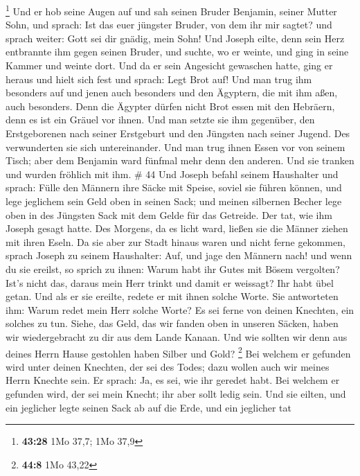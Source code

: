 \footnote{\textbf{43:28} 1Mo 37,7; 1Mo 37,9}  Und er hob
seine Augen auf und sah seinen Bruder Benjamin, seiner Mutter Sohn, und
sprach: Ist das euer jüngster Bruder, von dem ihr mir sagtet? und sprach
weiter: Gott sei dir gnädig, mein Sohn!  Und Joseph
eilte, denn sein Herz entbrannte ihm gegen seinen Bruder, und suchte, wo
er weinte, und ging in seine Kammer und weinte dort.  Und
da er sein Angesicht gewaschen hatte, ging er heraus und hielt sich fest
und sprach: Legt Brot auf!  Und man trug ihm besonders
auf und jenen auch besonders und den Ägyptern, die mit ihm aßen, auch
besonders. Denn die Ägypter dürfen nicht Brot essen mit den Hebräern,
denn es ist ein Gräuel vor ihnen.  Und man setzte sie ihm
gegenüber, den Erstgeborenen nach seiner Erstgeburt und den Jüngsten
nach seiner Jugend. Des verwunderten sie sich untereinander.
 Und man trug ihnen Essen vor von seinem Tisch; aber dem
Benjamin ward fünfmal mehr denn den anderen. Und sie tranken und wurden
fröhlich mit ihm. \# 44  Und Joseph befahl seinem
Haushalter und sprach: Fülle den Männern ihre Säcke mit Speise, soviel
sie führen können, und lege jeglichem sein Geld oben in seinen Sack;
 und meinen silbernen Becher lege oben in des Jüngsten
Sack mit dem Gelde für das Getreide. Der tat, wie ihm Joseph gesagt
hatte.  Des Morgens, da es licht ward, ließen sie die
Männer ziehen mit ihren Eseln.  Da sie aber zur Stadt
hinaus waren und nicht ferne gekommen, sprach Joseph zu seinem
Haushalter: Auf, und jage den Männern nach! und wenn du sie ereilst, so
sprich zu ihnen: Warum habt ihr Gutes mit Bösem vergolten?
 Ist's nicht das, daraus mein Herr trinkt und damit er
weissagt? Ihr habt übel getan.  Und als er sie ereilte,
redete er mit ihnen solche Worte.  Sie antworteten ihm:
Warum redet mein Herr solche Worte? Es sei ferne von deinen Knechten,
ein solches zu tun.  Siehe, das Geld, das wir fanden oben
in unseren Säcken, haben wir wiedergebracht zu dir aus dem Lande Kanaan.
Und wie sollten wir denn aus deines Herrn Hause gestohlen haben Silber
und Gold? \footnote{\textbf{44:8} 1Mo 43,22}  Bei welchem
er gefunden wird unter deinen Knechten, der sei des Todes; dazu wollen
auch wir meines Herrn Knechte sein.  Er sprach: Ja, es
sei, wie ihr geredet habt. Bei welchem er gefunden wird, der sei mein
Knecht; ihr aber sollt ledig sein.  Und sie eilten, und
ein jeglicher legte seinen Sack ab auf die Erde, und ein jeglicher tat
